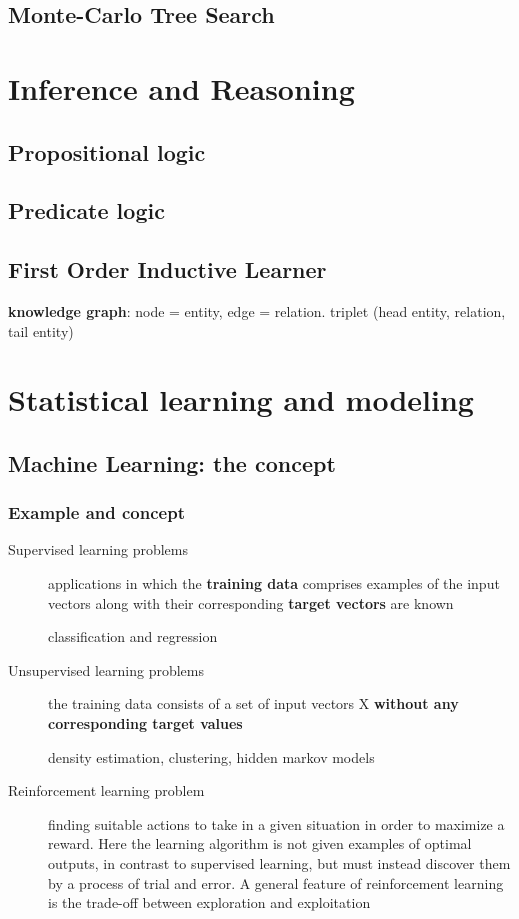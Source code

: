 \documentclass[11pt]{article}
\begin{document}
\subsection{Monte-Carlo Tree Search}
\label{sec:org86d06df}

\section{Inference and Reasoning}
\label{sec:org59cc4a4}
\subsection{Propositional logic}
\label{sec:org7a7b19e}
\subsection{Predicate logic}
\label{sec:org396898c}
\subsection{First Order Inductive Learner}
\label{sec:org4056dfa}
\textbf{knowledge graph}: node = entity, edge = relation.
triplet (head entity, relation, tail entity)
\section{Statistical learning and modeling}
\label{sec:org94a38d0}
\subsection{Machine Learning: the concept}
\label{sec:org70f08e2}
\subsubsection{Example and concept}
\label{sec:org62d9dcb}
\begin{description}
\item[{Supervised learning problems}] applications in which the \textbf{training data} comprises examples of the input
vectors along with their corresponding \textbf{target vectors} are known

classification and regression
\item[{Unsupervised learning problems}] the training data consists of a set of input vectors X \textbf{without any
corresponding target values}

density estimation, clustering, hidden markov models
\item[{Reinforcement learning problem}] finding suitable actions to take in a given situation in order to
maximize a reward. Here the learning algorithm is not given examples of
optimal outputs, in contrast to supervised learning, but must instead
discover them by a process of trial and error. A general feature of
reinforcement learning is the trade-off between exploration and exploitation
\end{description}
\end{document}
